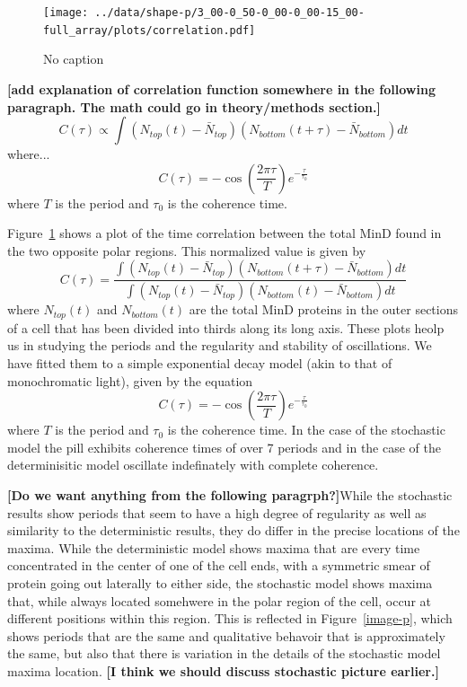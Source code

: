 \documentclass[letterpaper,twocolumn,amsmath,amssymb,pre]{revtex4-1}
\newcommand{\red}[1]{{\bf \color{red} #1}}
\newcommand{\fixme}[1]{\red{[#1]}}
\begin{document}
\begin{figure}
  \texttt{[image: ../data/shape-p/3\_00-0\_50-0\_00-0\_00-15\_00-full\_array/plots/correlation.pdf]}
  \caption{No caption}
  \label{corr-pill}
\end{figure}

\fixme{add explanation of correlation function somewhere in the
  following paragraph.  The math could go in theory/methods section.}
{
  \color{red}
  \begin{equation}
    C(\tau) \propto \int
      (N_{\textit{top}}(t) - \bar N_{\textit{top}})
      (N_{\textit{bottom}}(t+\tau) - \bar N_{\textit{bottom}})dt
  \end{equation}
  where...
  \begin{equation}
    C(\tau) = -\cos\left(\frac{2\pi\tau}{T}\right) e^{-\frac{\tau}{\tau_0}}
  \end{equation}
  where $T$ is the period and $\tau_0$ is the coherence time.
}

Figure~\ref{corr-pill} shows a plot of the time correlation between
the total MinD found in the two opposite polar regions.  This
normalized value is given by
\begin{equation}
  C(\tau) = \frac{\int
    (N_{\textit{top}}(t) - \bar N_{\textit{top}})
    (N_{\textit{bottom}}(t+\tau) - \bar N_{\textit{bottom}})dt
  }{
    \int
    (N_{\textit{top}}(t) - \bar N_{\textit{top}})
    (N_{\textit{bottom}}(t) - \bar N_{\textit{bottom}})dt
  }
\end{equation}
where $N_{\textit{top}}(t)$ and $N_{\textit{bottom}}(t)$ are the total
MinD proteins in the outer sections of a cell that has been divided
into thirds along its long axis.  These plots heolp us in studying the
periods and the regularity and stability of oscillations.  We have
fitted them to a simple exponential decay model (akin to that of
monochromatic light), given by the equation
\begin{equation}
  C(\tau) = -\cos\left(\frac{2\pi\tau}{T}\right) e^{-\frac{\tau}{\tau_0}}
\end{equation}
where $T$ is the period and $\tau_0$ is the coherence time.  In the
case of the stochastic model the pill exhibits coherence times of over
7 periods and in the case of the determinisitic model oscillate
indefinately with complete coherence.

\fixme{Do we want anything from the following paragrph?}While the
stochastic results show periods that seem to have a high degree of
regularity as well as similarity to the deterministic results, they do
differ in the precise locations of the maxima.  While the
deterministic model shows maxima that are every time concentrated in
the center of one of the cell ends, with a symmetric smear of protein
going out laterally to either side, the stochastic model shows maxima
that, while always located somehwere in the polar region of the cell,
occur at different positions within this region.  This is reflected in
Figure~\ref{image-p}, which shows periods that are the same and
qualitative behavoir that is approximately the same, but also that
there is variation in the details of the stochastic model maxima
location.  \fixme{I think we should discuss stochastic picture
  earlier.}
\end{document}
